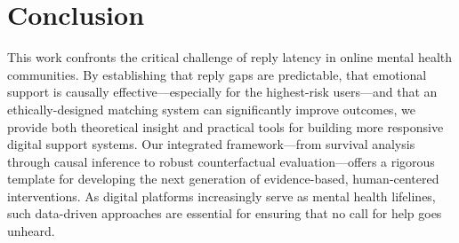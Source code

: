 \documentclass[letterpaper]{article} %
\begin{document}
\section{Conclusion}

This work confronts the critical challenge of reply latency in online mental health communities. By establishing that reply gaps are predictable, that emotional support is causally effective—especially for the highest-risk users—and that an ethically-designed matching system can significantly improve outcomes, we provide both theoretical insight and practical tools for building more responsive digital support systems. Our integrated framework—from survival analysis through causal inference to robust counterfactual evaluation—offers a rigorous template for developing the next generation of evidence-based, human-centered interventions. As digital platforms increasingly serve as mental health lifelines, such data-driven approaches are essential for ensuring that no call for help goes unheard.

\end{document}
